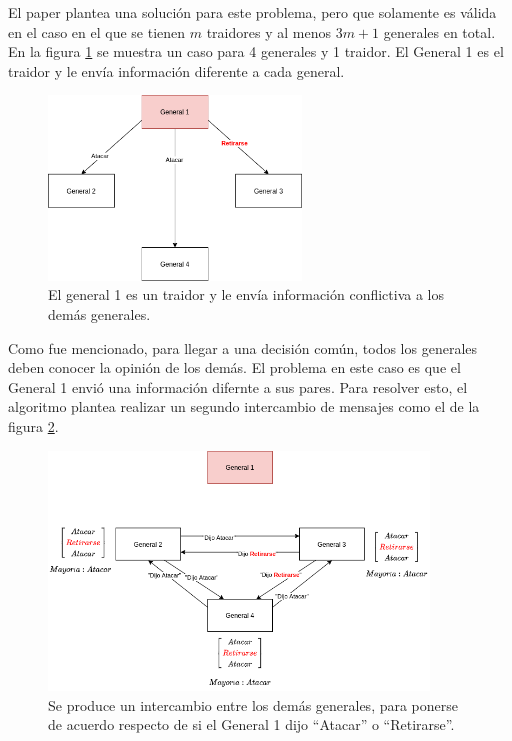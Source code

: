 El paper plantea una solución para este problema, pero que solamente es válida en el caso en el que se tienen $m$ traidores y al menos $3m + 1$ generales en total. En la figura \ref{fig:Byzantine_Generals_Problem_2} se muestra un caso para 4 generales y 1 traidor. El General 1 es el traidor y le envía información diferente a cada general.

\begin{figure}[H]
    \centering
    \includegraphics[width=0.6\textwidth]{img/Byzantine_Generals_Problem_2.png}
    \caption{El general 1 es un traidor y le envía información conflictiva a los demás generales.}
    \label{fig:Byzantine_Generals_Problem_2}
\end{figure}

Como fue mencionado, para llegar a una decisión común, todos los generales deben conocer la opinión de los demás. El problema en este caso es que el General 1 envió una información difernte a sus pares. Para resolver esto, el algoritmo plantea realizar un segundo intercambio de mensajes como el de la figura \ref{fig:Byzantine_Generals_Problem_3}.

\begin{figure}[H]
    \centering
    \includegraphics[width=0.9\textwidth]{img/Byzantine_Generals_Problem_3.png}
    \caption{Se produce un intercambio entre los demás generales, para ponerse de acuerdo respecto de si el General 1 dijo ``Atacar'' o ``Retirarse''.}
    \label{fig:Byzantine_Generals_Problem_3}
\end{figure}

